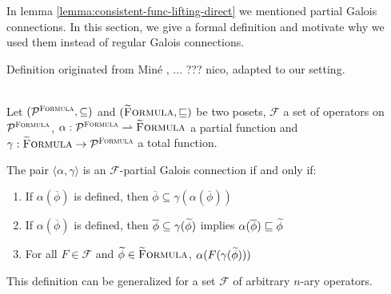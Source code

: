 In lemma \ref{lemma:consistent-func-lifting-direct} we mentioned partial Galois connections.
In this section, we give a formal definition and motivate why we used them instead of regular Galois connections.

Definition originated from Miné \cite{mine2004weakly}, ... ??? nico, adapted to our setting.
\begin{definition}~\\
    \label{def:pgc}
    Let $(\mathcal{P}^{\textup{\textsc{Formula}}}, \subseteq)$ and $(\textup{\textsc{\ensuremath{\widetilde{\text{F}}}ormula}}, \sqsubseteq)$ be two posets, $\mathcal{F}$ a set of operators on $\mathcal{P}^{\textup{\textsc{Formula}}}$, $\alpha : \mathcal{P}^{\textup{\textsc{Formula}}} \rightharpoonup \textup{\textsc{\ensuremath{\widetilde{\text{F}}}ormula}}$ a partial function and $\gamma : \textup{\textsc{\ensuremath{\widetilde{\text{F}}}ormula}} \rightarrow \mathcal{P}^{\textup{\textsc{Formula}}}$ a total function. 
    
    The pair $\langle \alpha, \gamma \rangle$ is an $\mathcal{F}$-partial Galois connection if and only if:
    \begin{enumerate}
        \item If $\alpha(\overline{\phi})$ is defined, then $\overline{\phi} \subseteq \gamma(\alpha(\overline{\phi}))$
        \item If $\alpha(\overline{\phi})$ is defined, then $\overline{\phi} \subseteq \gamma(\widetilde{\phi})$ implies $\alpha(\overline{\phi}) \sqsubseteq \widetilde{\phi}$
        \item For all $F \in \mathcal{F}$ and $\widetilde{\phi} \in \textup{\textsc{\ensuremath{\widetilde{\text{F}}}ormula}}$, $\alpha(F(\gamma(\widetilde{\phi})))$
    \end{enumerate}
This definition can be generalized for a set $\mathcal{F}$ of arbitrary $n$-ary operators.
\end{definition}

